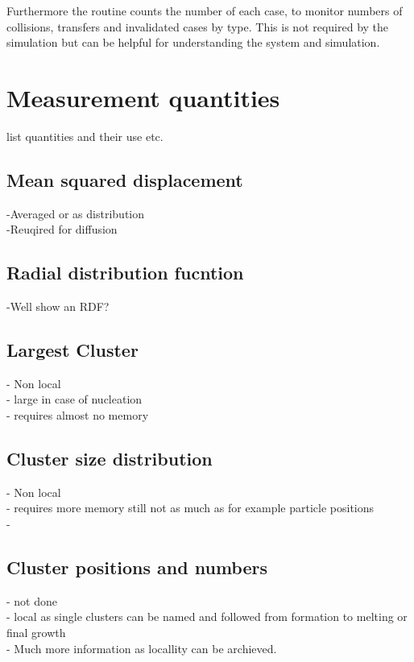 Furthermore the routine counts the number of each case, to monitor numbers of collisions, transfers and invalidated cases by type. This is not required by the simulation but can be helpful for understanding the system and simulation.\\




\section{Measurement quantities}
\label{sec:cluster_quantities}
list quantities and their use etc.

\subsection{Mean squared displacement}
\label{sec:MSD}
-Averaged or as distribution\\
-Reuqired for diffusion\\

\subsection{Radial distribution fucntion}
\label{sec:RDF}
-Well show an RDF?

\subsection{Largest Cluster}
\label{sec:lc}
- Non local\\
- large in case of nucleation\\
- requires almost no memory\\

\subsection{Cluster size distribution}
\label{sec:pnt}
- Non local\\
- requires more memory still not as much as for example particle positions\\
- 

\subsection{Cluster positions and numbers}
\label{sec:cluster_position}
- not done\\
- local as single clusters can be named and followed from formation to melting or final growth\\
- Much more information as locallity can be archieved.\\


